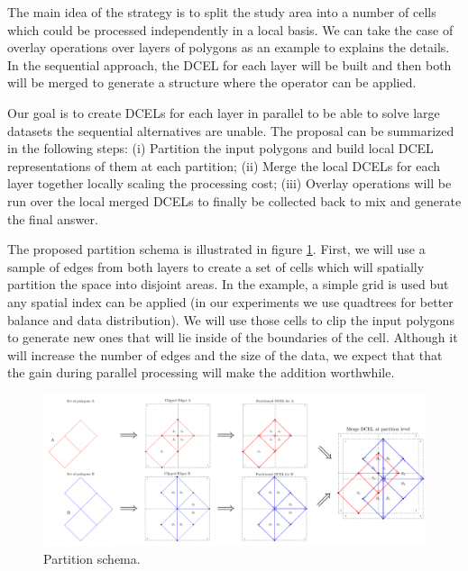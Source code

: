 The main idea of the strategy is to split the study area into a number of cells which could be processed independently in a local basis. We can take the case of overlay operations over layers of polygons as an example to explains the details. In the sequential approach, the DCEL for each layer will be built and then both will be merged to generate a structure where the operator can be applied.  

Our goal is to create DCELs for each layer in parallel to be able to solve large datasets the sequential alternatives are unable.  The proposal can be summarized in the following steps: (i) Partition the input polygons and build local DCEL representations of them at each partition; (ii) Merge the local DCELs for each layer together locally scaling the processing cost; (iii) Overlay operations will be run over the local merged DCELs to finally be collected back to mix and generate the final answer.  

The proposed partition schema is illustrated in figure \ref{fig:overlay_parted}.  First, we will use a sample of edges from both layers to create a set of cells which will spatially partition the space into disjoint areas.  In the example, a simple grid is used but any spatial index can be applied (in our experiments we use quadtrees for better balance and data distribution).  We will use those cells to clip the input polygons to generate new ones that will lie inside of the boundaries of the cell.  Although it will increase the number of edges and the size of the data, we expect that that the gain during parallel processing will make the addition worthwhile.

\begin{figure}[!ht]
    \centering
    \includegraphics[width=\textwidth]{figures/01-OverlayParted}
    \caption{Partition schema.}\label{fig:overlay_parted}
\end{figure}

